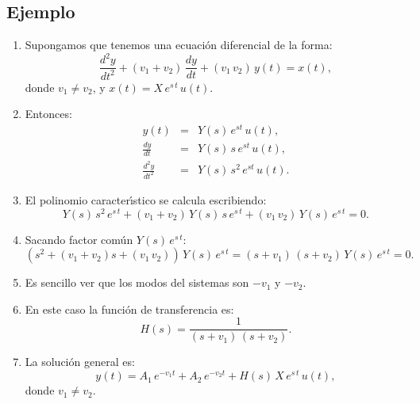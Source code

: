 \subsection{Ejemplo}

\begin{enumerate}
	\item Supongamos que tenemos una ecuaci\'{o}n diferencial de la forma:
	\begin{equation}
		\frac{d^{2}y}{dt^{2}} + (v_{1} + v_{2}) \, \frac{dy}{dt} + (v_{1} \, v_{2}) \, y(t) = x(t), 
	\end{equation}
	donde $v_{1} \neq v_{2}$, y $x(t) = X \, e^{s \, t} \, u(t)$.
	
	\item Entonces: 
	\begin{eqnarray}
		y(t) &=& Y(s) \, e^{s t} \, u(t),               \\
		\frac{dy}{dt} &=& Y(s) \, s \, e^{s t}  \, u(t), \\  
		\frac{d^{2}y}{dt^{2}} &=& Y(s) \, s^{2} \, e^{s t} \, u(t).
	\end{eqnarray}
	
	\item El polinomio caracter\'{\i}stico se calcula escribiendo:
	\begin{equation}
		Y(s) \, s^{2} \, e^{s \, t} + (v_{1} + v_{2}) \, Y(s) \, s \, e^{s \, t} + (v_{1} \, v_{2}) \, Y(s) \, e^{s \, t} = 0.
	\end{equation}
	
	\item Sacando factor com\'{u}n $Y(s) \, e^{s \, t}$:
	\begin{equation}
		(s^{2}  + (v_{1} + v_{2}) s + (v_{1} \, v_{2})) \, Y(s) \, e^{s \, t} = (s + v_{1})\,(s + v_{2}) \, Y(s) \, e^{s \, t} = 0.
	\end{equation}
	
	\item Es sencillo ver que los modos del sistemas son $-v_{1}$ y $-v_{2}$.
	\item En este caso la funci\'{o}n de transferencia es:
	\begin{equation}
		H(s) = \frac{1}{(s + v_{1})\,(s + v_{2})}.
	\end{equation}
	
	\item La soluci\'{o}n general es:
	\begin{equation}
		y(t) = A_{1} \, e^{-v_{1} t} + A_{2} \, e^{-v_{2} t} + H(s) \, X \, e^{s \, t} \, u(t),
	\end{equation}
	donde $v_{1} \neq v_{2}$.
	

\end{enumerate}
